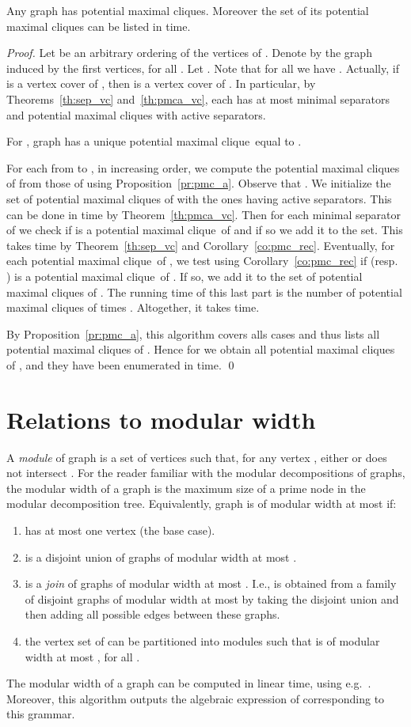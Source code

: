 \documentclass{llncs}
\newcommand{\pmc}{potential maximal clique}
\begin{document}
\begin{theorem}\label{th:pmc_vc}
Any graph  has  \pmc s. Moreover the set of its \pmc s can be listed in  time.
\end{theorem}
\begin{proof}
Let  be an arbitrary ordering of the vertices of . Denote by  the graph  induced by the first  
vertices, for all . Let . Note that for all  we have . Actually, if  is a vertex cover of , then  is a vertex 
cover of . In particular, by Theorems~\ref{th:sep_vc} and~\ref{th:pmca_vc}, each  has at most  minimal separators and  \pmc s with active separators.

For , graph  has a unique \pmc\ equal to .

For each  from  to , in increasing order, we compute the \pmc s of  from those of  using Proposition~\ref{pr:pmc_a}. 
Observe that . We initialize the set of \pmc s of  with the ones having active separators. This can be done in  time by Theorem~\ref{th:pmca_vc}.
Then for each minimal separator  of  we check if  is a \pmc\ of  and if so we add it to the set. 
This takes  time by Theorem~\ref{th:sep_vc} and Corollary~\ref{co:pmc_rec}.
Eventually, for each \pmc\  of , we test using Corollary~\ref{co:pmc_rec} if  (resp. ) is a \pmc\ of . If so, we add it to the set of \pmc s of . The running time of this last part is the number of \pmc s of  times . Altogether, it takes  time.

By Proposition~\ref{pr:pmc_a}, this algorithm  covers alls cases and thus lists all \pmc s of . Hence for  we obtain all \pmc s of , and they have been enumerated in  time.
\qed
\end{proof}

\section{Relations to modular width}\label{se:mw}

A \emph{module} of graph  is a set of vertices  such that, for any vertex , either  or  does not intersect . For the reader familiar with the modular decompositions of graphs, the modular width  of a graph  is the maximum size of a prime node in the modular decomposition tree. Equivalently,
graph  is of modular width at most  if:
\begin{enumerate}
\item  has at most one vertex (the base case).
\item  is a disjoint union of graphs of modular width at most .
\item  is a \emph{join} of graphs of modular width at most . I.e.,  is obtained from a family of disjoint graphs of modular width at most  by taking the disjoint union and then adding all possible edges between these graphs.
\item the vertex set of  can be partitioned into  modules  such that  is of modular width at most , for all .
\end{enumerate}
The modular width of a graph can be computed in linear time, using e.g.~\cite{TCHP08}. Moreover, this algorithm outputs the algebraic expression of  corresponding to this grammar. 
\end{document}

